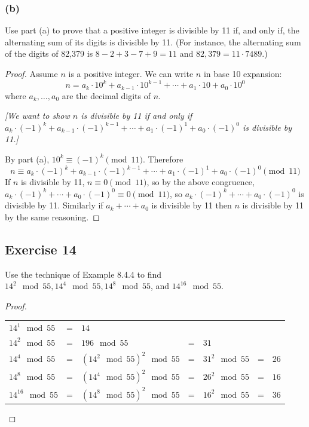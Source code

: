 \documentclass[14pt]{extarticle}
\begin{document}
\subsubsection{(b)}
Use part (a) to prove that a positive integer is divisible by 11 if, and only if, the alternating sum of its digits is 
divisible by 11. (For instance, the alternating sum of the digits of 82,379 is \(8 - 2 + 3 - 7 + 9 = 11\) and 
\(82,379 = 11 \cdot 7489\).)

\begin{proof}
Assume \(n\) is a positive integer. We can write \(n\) in base 10 expansion:
\[
n = a_k \cdot 10^k + a_{k-1} \cdot 10^{k-1} + \cdots + a_1 \cdot 10 + a_0 \cdot 10^0
\]
where \(a_k, \ldots, a_0\) are the decimal digits of $n$.

{\it [We want to show $n$ is divisible by 11 if and only if \(a_k \cdot (-1)^k + a_{k-1} \cdot (-1)^{k-1} + \cdots + 
a_1 \cdot (-1)^1 + a_0 \cdot (-1)^0\) is divisible by 11.]}

By part (a), \(10^k \equiv (-1)^{k} \pmod {11}\). Therefore
\[
n \equiv a_k \cdot (-1)^k + a_{k-1} \cdot (-1)^{k-1} + \cdots + a_1 \cdot (-1)^1 + a_0 \cdot (-1)^0 \pmod{11}
\]
If \(n\) is divisible by 11, \(n \equiv 0 \pmod{11}\), so by the above congruence, \(a_k \cdot (-1)^k + \cdots + a_0 
\cdot (-1)^0 \equiv 0 \pmod{11}\), so \(a_k \cdot (-1)^k + \cdots + a_0 \cdot (-1)^0\) is divisible by 11. Similarly 
if \(a_k + \cdots + a_0\) is divisible by 11 then $n$ is 
divisible by 11 by the same reasoning.
\end{proof}

\subsection{Exercise 14}
Use the technique of Example 8.4.4 to find \(14^2 \mod 55, 14^4 \mod 55, 14^8 \mod 55\), and \(14^{16} \mod 55\).

\begin{proof}
\begin{tabular}{lclclcl}
\(14^1 \mod 55\) & = & \(14\) \\
\(14^2 \mod 55\) & = & \(196 \mod 55\) & = & \(31\) \\
\(14^4 \mod 55\) & = & \((14^2 \mod 55)^2 \mod 55\) & = & \(31^2 \mod 55\) & = & \(26\) \\
\(14^8 \mod 55\) & = & \((14^4 \mod 55)^2 \mod 55\) & = & \(26^2 \mod 55\) & = & \(16\) \\
\(14^{16} \mod 55\) & = & \((14^8 \mod 55)^2 \mod 55\) & = & \(16^2 \mod 55\) & = & \(36\)
\end{tabular}
\end{proof}
\end{document}
